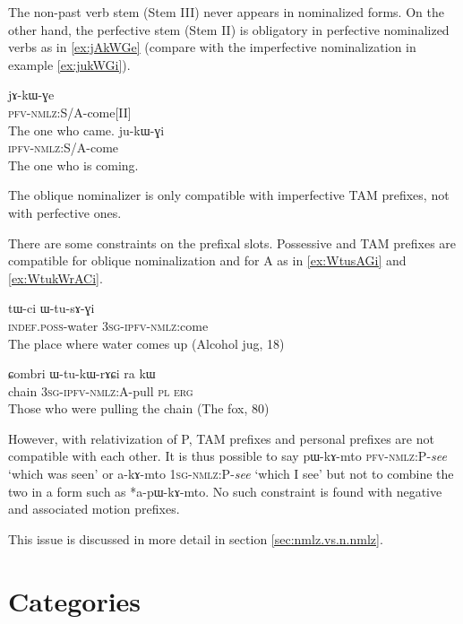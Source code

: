 \documentclass[oldfontcommands,oneside,a4paper,11pt]{article}
\newcommand{\ipa}[1]{{\phon #1}} %
\begin{document}
The non-past verb stem (Stem III) never appears in nominalized forms. On the other hand, the perfective stem (Stem II) is obligatory in perfective nominalized verbs as in \ref{ex:jAkWGe} (compare with the imperfective nominalization in example \ref{ex:jukWGi}).

 \begin{exe}
\ex \label{ex:jAkWGe}
\gll
  	\ipa{jɤ-kɯ-ɣe}	   \\
  \textsc{pfv-nmlz:}S/A-come[II]   \\
\glt The one who came.
\ex \label{ex:jukWGi}
\gll
  	\ipa{ju-kɯ-ɣi}	   \\
  \textsc{ipfv-nmlz:}S/A-come   \\
\glt The one who is coming.
 \end{exe}
 
The oblique nominalizer is only compatible with imperfective TAM prefixes, not with perfective ones. 
 
There are some constraints on  the prefixal slots. Possessive and TAM prefixes are compatible for oblique nominalization and for A as in \ref{ex:WtusAGi} and \ref{ex:WtukWrACi}.

 \begin{exe}
\ex \label{ex:WtusAGi}
\gll
\ipa{tɯ-ci}  	\ipa{ɯ-tu-sɤ-ɣi}  \\
\textsc{indef.poss}-water \textsc{3sg-ipfv-nmlz}:come \\
\glt  The place where water comes up (Alcohol jug, 18)
 \end{exe}
 \begin{exe}
\ex \label{ex:WtukWrACi}
\gll 
\ipa{ɕombri}  	\ipa{ɯ-tu-kɯ-rɤɕi}  	\ipa{ra}  	\ipa{kɯ}  \\
chain \textsc{3sg-ipfv-nmlz:A}-pull \textsc{pl} \textsc{erg} \\
\glt Those who were pulling the chain (The fox, 80)
 \end{exe}

However, with relativization of P, TAM prefixes and personal prefixes are not compatible with each other. It is thus possible to say \ipa{pɯ-kɤ-mto} \textsc{pfv-nmlz:P}-\textit{see} `which was seen' or \ipa{a-kɤ-mto} \textsc{1sg-nmlz:P}-\textit{see} `which I see' but not to combine the two in a form such as *\ipa{a-pɯ-kɤ-mto}. No such constraint is found with negative and associated motion prefixes. 


This issue is discussed in more detail in section \ref{sec:nmlz.vs.n.nmlz}.
  
\section{Categories}
\end{document}
